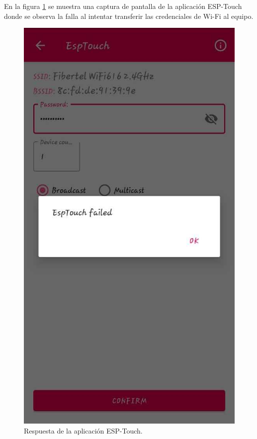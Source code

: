 En la figura \ref{fig:pruIni_2_ESPT} se muestra una captura de pantalla de la aplicación ESP-Touch donde se observa la falla al intentar transferir las credenciales de Wi-Fi al equipo.

\begin{figure}[htpb]
	\centering
	\includegraphics[scale=0.4]{./Figures/ESP_Touch_fail.jpeg}
	\caption{Respuesta de la aplicación ESP-Touch.}
	\label{fig:pruIni_2_ESPT}
\end{figure}

